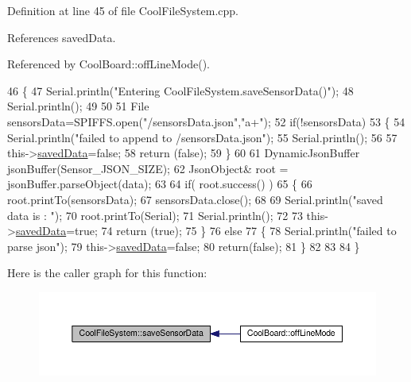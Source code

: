 Definition at line 45 of file Cool\+File\+System.\+cpp.



References saved\+Data.



Referenced by Cool\+Board\+::off\+Line\+Mode().


\begin{DoxyCode}
46 \{
47     Serial.println(\textcolor{stringliteral}{"Entering CoolFileSystem.saveSensorData()"});
48     Serial.println();
49 
50     
51     File sensorsData=SPIFFS.open(\textcolor{stringliteral}{"/sensorsData.json"},\textcolor{stringliteral}{"a+"});
52     \textcolor{keywordflow}{if}(!sensorsData)
53     \{
54         Serial.println(\textcolor{stringliteral}{"failed to append to /sensorsData.json"});
55         Serial.println();
56 
57         this->\hyperlink{classCoolFileSystem_ad398e0c5c41a0c88acdf5d672aa71351}{savedData}=\textcolor{keyword}{false};
58         \textcolor{keywordflow}{return} (\textcolor{keyword}{false}); 
59     \}   
60 
61     DynamicJsonBuffer jsonBuffer(Sensor\_JSON\_SIZE);
62     JsonObject& root = jsonBuffer.parseObject(data);
63 
64     \textcolor{keywordflow}{if}( root.success() )
65     \{
66         root.printTo(sensorsData);
67         sensorsData.close();
68 
69         Serial.println(\textcolor{stringliteral}{"saved data is : "});
70         root.printTo(Serial);
71         Serial.println();
72 
73         this->\hyperlink{classCoolFileSystem_ad398e0c5c41a0c88acdf5d672aa71351}{savedData}=\textcolor{keyword}{true};
74         \textcolor{keywordflow}{return} (\textcolor{keyword}{true});      
75     \}
76     \textcolor{keywordflow}{else}
77     \{
78         Serial.println(\textcolor{stringliteral}{"failed to parse json"});
79         this->\hyperlink{classCoolFileSystem_ad398e0c5c41a0c88acdf5d672aa71351}{savedData}=\textcolor{keyword}{false};
80         \textcolor{keywordflow}{return}(\textcolor{keyword}{false});
81     \}
82     
83 
84 \}
\end{DoxyCode}
Here is the caller graph for this function\+:\nopagebreak
\begin{figure}[H]
\begin{center}
\leavevmode
\includegraphics[width=350pt]{classCoolFileSystem_a4c560c2ddd40b74b7758e6ceb2c58957_icgraph}
\end{center}
\end{figure}
\mbox{\label{classCoolFileSystem_a32dad79ae80182a83e2e8f52286b7c7b}} 
